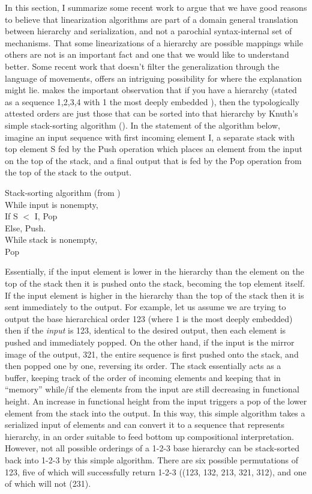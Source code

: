 \documentclass[output=paper,colorlinks,citecolor=brown]{langscibook}
\begin{document}
In this section, I summarize some recent work to argue that we have good reasons to believe that linearization algorithms are part of a domain general translation between hierarchy and serialization, and not a parochial syntax-internal set of mechanisms. That some linearizations of a hierarchy are possible mappings while others are not is an important fact and one that we would like to understand better.   Some recent work that doesn't filter the generalization through the language of movements, offers an intriguing possibility for where the explanation might lie. 
\citet{medeiros24, medeiros18} makes the important observation that if you have a hierarchy (stated as a sequence 1,2,3,4 with 1 the most deeply embedded ), then the typologically attested orders are just those that can be sorted into that hierarchy by Knuth's simple stack-sorting algorithm (\cite{knuth1968}).  In the statement of the algorithm below, imagine an input sequence with first incoming element I, a separate stack with top element S  fed by the Push operation which places an element from the input on the top of the stack, and a final output that is fed by the Pop operation from the top of the stack to the output.

\ea\label{ex:stacksort}
Stack-sorting algorithm (from \citealt{medeiros24})\\
 \noindent While input is nonempty, \\
 \hspace*{1in}If S $<$ I, Pop \\
 \hspace*{1in}Else, Push. \\
 \noindent While stack is nonempty, \\
 \hspace*{1in}Pop
\z

Essentially, if the input element is lower in the hierarchy than the element on the top of the stack then it is pushed onto the stack, becoming the top element itself. If the input element is higher in the hierarchy than the top of the stack then it is sent immediately to the output.   For example, let us assume we are trying to output the base hierarchical order 123 (where 1 is the most deeply embedded) then if the \textit{input} is  123, identical to the desired output, then each element is pushed and immediately popped. On the other hand, if the input is the mirror image of the output, 321, the entire sequence is first pushed onto the stack, and then popped one by one, reversing its order.  The stack essentially acts as a buffer, keeping track of the order of incoming elements and keeping that in “memory” while/if the elements from the input are still decreasing in functional height. An increase in functional height from the input triggers a pop of the lower element from the stack into the output. In this way, this simple  algorithm takes a serialized input of elements and can convert it to a sequence that represents  hierarchy, in an order suitable to feed bottom up compositional interpretation.   However, not all possible orderings of a 1-2-3 base hierarchy can be stack-sorted back into 1-2-3 by this simple algorithm.  There are six possible permutations of 123, five of which will successfully return 1-2-3 ((123, 132, 213, 321, 312), and one of which will not (231). 
\end{document}

